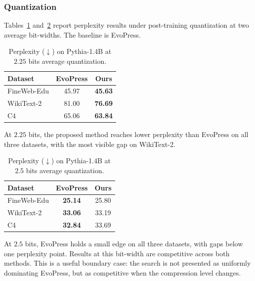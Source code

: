 \subsubsection{Quantization}
\label{subsec:lm-quant}

Tables~\ref{tab:lm-quant-225} and~\ref{tab:lm-quant-25} report perplexity results under post-training quantization at two average bit-widths. The baseline is EvoPress.

\begin{table}[H]
\centering
\caption{Perplexity ($\downarrow$) on Pythia-1.4B at $2.25$ bits average quantization.}
\label{tab:lm-quant-225}
\begin{tabular}{lcc}
  \toprule
  \textbf{Dataset} & \textbf{EvoPress} & \textbf{Ours} \\
  \midrule
  FineWeb-Edu & 45.97  & \textbf{45.63} \\
  WikiText-2  & 81.00  & \textbf{76.69} \\
  C4          & 65.06  & \textbf{63.84} \\
  \bottomrule
\end{tabular}
\end{table}

At $2.25$ bits, the proposed method reaches lower perplexity than EvoPress on all three datasets, with the most visible gap on WikiText-2.

\begin{table}[H]
\centering
\caption{Perplexity ($\downarrow$) on Pythia-1.4B at $2.5$ bits average quantization.}
\label{tab:lm-quant-25}
\begin{tabular}{lcc}
  \toprule
  \textbf{Dataset} & \textbf{EvoPress} & \textbf{Ours} \\
  \midrule
  FineWeb-Edu & \textbf{25.14} & 25.80 \\
  WikiText-2  & \textbf{33.06} & 33.19 \\
  C4          & \textbf{32.84} & 33.69 \\
  \bottomrule
\end{tabular}
\end{table}

At $2.5$ bits, EvoPress holds a small edge on all three datasets, with gaps below one perplexity point. Results at this bit-width are competitive across both methods. This is a useful boundary case: the search is not presented as uniformly dominating EvoPress, but as competitive when the compression level changes.
